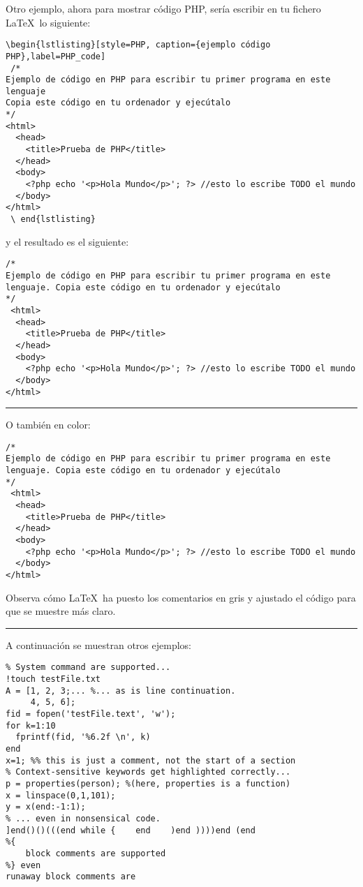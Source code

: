 Otro ejemplo, ahora para mostrar código PHP, sería escribir en tu fichero \LaTeX~lo siguiente:
\begin{lstlisting}[style=Latex-color,numbers=none]
 \begin{lstlisting}[style=PHP, caption={ejemplo código PHP},label=PHP_code]
 /* 
Ejemplo de código en PHP para escribir tu primer programa en este lenguaje
Copia este código en tu ordenador y ejecútalo
*/
<html>
  <head>
    <title>Prueba de PHP</title>
  </head>
  <body>
    <?php echo '<p>Hola Mundo</p>'; ?> //esto lo escribe TODO el mundo
  </body>
</html>
 \ end{lstlisting}
\end{lstlisting}
 
 y el resultado es el siguiente:
 
 \begin{lstlisting}[style=PHP, caption={ejemplo código PHP},label=PHP_code,firstnumber=100]
/* 
Ejemplo de código en PHP para escribir tu primer programa en este lenguaje. Copia este código en tu ordenador y ejecútalo
*/
 <html>
  <head>
    <title>Prueba de PHP</title>
  </head>
  <body>
    <?php echo '<p>Hola Mundo</p>'; ?> //esto lo escribe TODO el mundo
  </body>
</html>
 \end{lstlisting}
 \vspace{1em}
\noindent\hrule
\vspace{1em}
 O también en color: 
 \begin{lstlisting}[style=PHP-color, caption={ejemplo código PHP},label=PHP_code2]
/* 
Ejemplo de código en PHP para escribir tu primer programa en este lenguaje. Copia este código en tu ordenador y ejecútalo
*/
 <html>
  <head>
    <title>Prueba de PHP</title>
  </head>
  <body>
    <?php echo '<p>Hola Mundo</p>'; ?> //esto lo escribe TODO el mundo
  </body>
</html>
 \end{lstlisting}
 
 Observa cómo \LaTeX~ha puesto los comentarios en gris y ajustado el código para que se muestre más claro.
\vspace{1em}
\noindent\hrule
\vspace{1em}
 A continuación se muestran otros ejemplos:
 \begin{lstlisting}[style=Matlab-color, caption={ejemplo código Matlab en color},label=Matlab_code]
%% Code sections are highlighted.
% System command are supported...
!touch testFile.txt
A = [1, 2, 3;... %... as is line continuation.
     4, 5, 6];
fid = fopen('testFile.text', 'w');
for k=1:10
  fprintf(fid, '%6.2f \n', k)
end
x=1; %% this is just a comment, not the start of a section
% Context-sensitive keywords get highlighted correctly...
p = properties(person); %(here, properties is a function)
x = linspace(0,1,101);
y = x(end:-1:1);
% ... even in nonsensical code.
]end()()(((end while {    end    )end ))))end (end
%{
    block comments are supported
%} even
runaway block comments are
\end{lstlisting}

